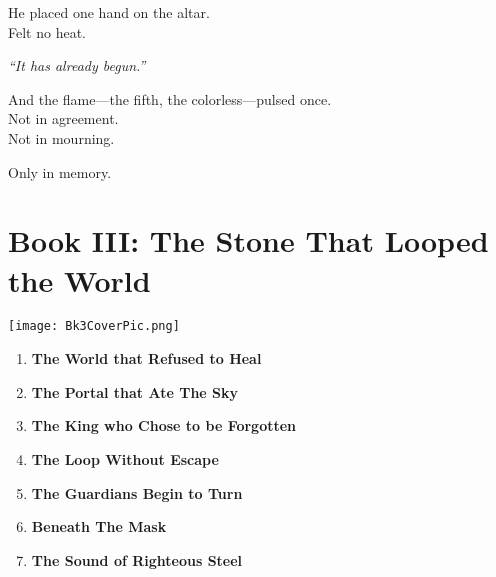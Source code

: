 \documentclass[9pt]{article}
\begin{document}
\vspace{0.5em}
He placed one hand on the altar.\\
Felt no heat.

\vspace{0.5em}
\textit{``It has already begun.''}

\vspace{0.5em}
And the flame---the fifth, the colorless---pulsed once.\\
Not in agreement.\\
Not in mourning.

\vspace{0.5em}
Only in memory.


\newpage

\section*{Book III: The Stone That Looped the World} 

\vspace{1in}

\begin{center}
    \texttt{[image: Bk3CoverPic.png]}
\end{center}

\vspace{1in}

\begin{enumerate}
    \item \textbf{The World that Refused to Heal} 

    \vspace{1em}
    \item \textbf{The Portal that Ate The Sky} 

    \vspace{1em}
    \item \textbf{The King who Chose to be Forgotten} 

    \vspace{1em}
    \item \textbf{The Loop Without Escape} 

    \vspace{1em}
    \item \textbf{The Guardians Begin to Turn} 

    \vspace{1em}
    \item \textbf{Beneath The Mask}

    \vspace{1em}
    \item \textbf{The Sound of Righteous Steel} 

\end{enumerate}
\end{document}
